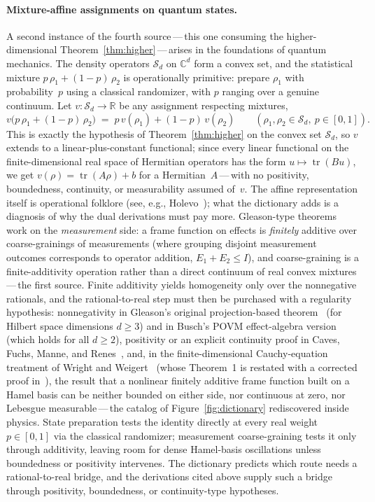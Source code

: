 \documentclass{article}
\theoremstyle{plain}
\theoremstyle{definition}
\newcommand{\R}{\mathbb{R}}
\begin{document}
\paragraph{Mixture-affine assignments on quantum states.}
A second instance of the fourth source\,---\,this one consuming the
higher-dimensional Theorem~\ref{thm:higher}\,---\,arises in the
foundations of quantum mechanics. The density operators
$\mathcal{S}_d$ on $\mathbb{C}^d$ form a convex set, and the
statistical mixture $p\,\rho_1+(1-p)\,\rho_2$ is operationally
primitive: prepare $\rho_1$ with probability~$p$ using a classical
randomizer, with $p$ ranging over a genuine continuum. Let
$v\colon\mathcal{S}_d\to\R$ be any assignment respecting mixtures,
\[
v\bigl(p\,\rho_1+(1-p)\,\rho_2\bigr)\;=\;p\,v(\rho_1)+(1-p)\,v(\rho_2)
\qquad(\rho_1,\rho_2\in\mathcal{S}_d,\ p\in[0,1]).
\]
This is exactly the hypothesis of Theorem~\ref{thm:higher} on the
convex set $\mathcal{S}_d$, so $v$ extends to a linear-plus-constant
functional; since every linear functional on the finite-dimensional
real space of Hermitian operators has the form
$u\mapsto\operatorname{tr}(Bu)$, we get
$v(\rho)=\operatorname{tr}(A\rho)+b$ for a Hermitian~$A$\,---\,with
no positivity, boundedness, continuity, or measurability assumed
of~$v$. The affine representation itself is operational folklore
(see, e.g., Holevo~\cite[Lemma~1.6.1]{Holevo1982}); what the
dictionary adds is a diagnosis of why the dual derivations must pay
more. Gleason-type theorems work on the \emph{measurement} side: a
frame function on effects is \emph{finitely} additive over
coarse-grainings of measurements (where grouping disjoint measurement
outcomes corresponds to operator addition, $E_1 + E_2 \le I$), and
coarse-graining is a finite-additivity operation rather than a direct continuum of real convex mixtures\,---\,the first source.
Finite additivity yields homogeneity only over the nonnegative
rationals, and the rational-to-real step must then be purchased with
a regularity hypothesis: nonnegativity in Gleason's original
projection-based theorem~\cite{Gleason1957} (for Hilbert space dimensions $d \ge 3$) and in Busch's POVM effect-algebra
version~\cite{Busch2003} (which holds for all $d \ge 2$), positivity or an explicit continuity proof
in Caves, Fuchs, Manne, and Renes~\cite{CFMR2004}, and, in the
finite-dimensional Cauchy-equation treatment of Wright and
Weigert~\cite{WrightWeigert2019} (whose Theorem~1 is restated with a
corrected proof in~\cite{WrightWeigert2020}), the result that a nonlinear
finitely additive frame function built on a Hamel basis can be neither
bounded on either side, nor continuous at zero, nor Lebesgue
measurable\,---\,the catalog of Figure~\ref{fig:dictionary}
rediscovered inside physics. State
preparation tests the identity directly at every real weight
$p\in[0,1]$ via the classical randomizer; measurement coarse-graining
tests it only through additivity, leaving room for dense Hamel-basis
oscillations unless boundedness or positivity intervenes. The dictionary
predicts which route needs a rational-to-real bridge, and the derivations cited above supply such a bridge through positivity, boundedness, or continuity-type hypotheses.
\end{document}
